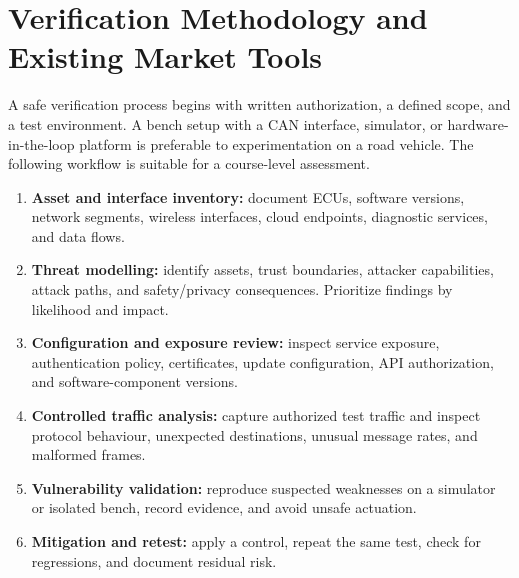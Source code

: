 \documentclass[11pt]{article}
\begin{document}
\section{Verification Methodology and Existing Market Tools}
A safe verification process begins with written authorization, a defined scope, and a test environment. A bench setup with a CAN interface, simulator, or hardware-in-the-loop platform is preferable to experimentation on a road vehicle. The following workflow is suitable for a course-level assessment.

\begin{enumerate}
\item \textbf{Asset and interface inventory:} document ECUs, software versions, network segments, wireless interfaces, cloud endpoints, diagnostic services, and data flows.
\item \textbf{Threat modelling:} identify assets, trust boundaries, attacker capabilities, attack paths, and safety/privacy consequences. Prioritize findings by likelihood and impact.
\item \textbf{Configuration and exposure review:} inspect service exposure, authentication policy, certificates, update configuration, API authorization, and software-component versions.
\item \textbf{Controlled traffic analysis:} capture authorized test traffic and inspect protocol behaviour, unexpected destinations, unusual message rates, and malformed frames.
\item \textbf{Vulnerability validation:} reproduce suspected weaknesses on a simulator or isolated bench, record evidence, and avoid unsafe actuation.
\item \textbf{Mitigation and retest:} apply a control, repeat the same test, check for regressions, and document residual risk.
\end{enumerate}
\end{document}
